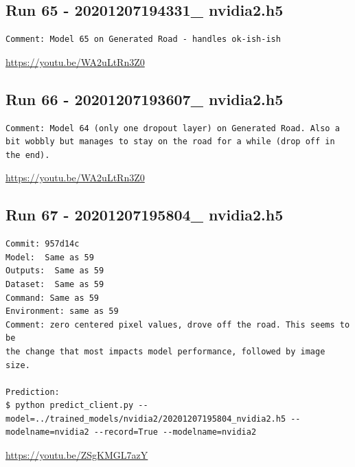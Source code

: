 \subsection{Run 65 - 20201207194331\_ nvidia2.h5 }
\begin{verbatim}
Comment: Model 65 on Generated Road - handles ok-ish-ish
\end{verbatim}
\url{https://youtu.be/WA2uLtRn3Z0}

\subsection{Run 66 - 20201207193607\_ nvidia2.h5}
\begin{verbatim}
Comment: Model 64 (only one dropout layer) on Generated Road. Also a bit wobbly but manages to stay on the road for a while (drop off in the end).
\end{verbatim}
\url{https://youtu.be/WA2uLtRn3Z0}


\subsection{Run 67 - 20201207195804\_ nvidia2.h5}
\begin{verbatim}
Commit: 957d14c
Model:  Same as 59
Outputs:  Same as 59
Dataset:  Same as 59
Command: Same as 59
Environment: same as 59 
Comment: zero centered pixel values, drove off the road. This seems to be
the change that most impacts model performance, followed by image size.

Prediction:
$ python predict_client.py --model=../trained_models/nvidia2/20201207195804_nvidia2.h5 --modelname=nvidia2 --record=True --modelname=nvidia2

\end{verbatim}
\url{https://youtu.be/ZSgKMGL7azY}

